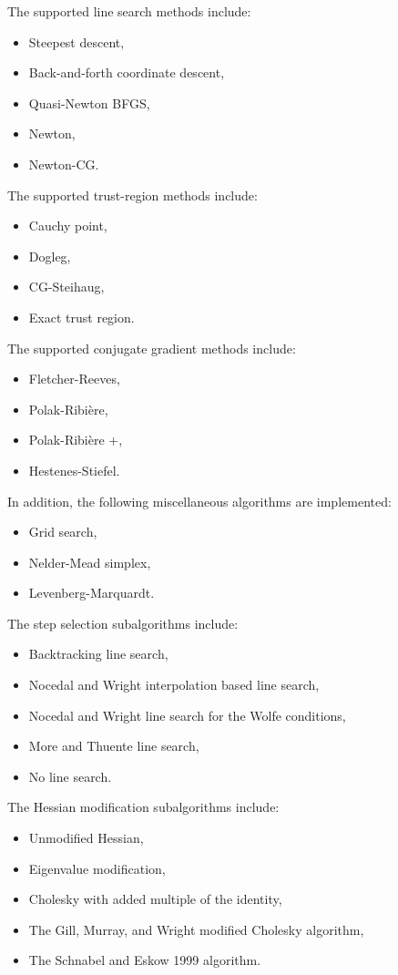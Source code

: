 The supported line search methods include:
\begin{itemize}
\item Steepest descent,
\item Back-and-forth coordinate descent,
\item Quasi-Newton BFGS,
\item Newton,
\item Newton-CG.
\end{itemize}

The supported trust-region methods include:
\begin{itemize}
\item Cauchy point,
\item Dogleg,
\item CG-Steihaug,
\item Exact trust region.
\end{itemize}

The supported conjugate gradient methods include:
\begin{itemize}
\item Fletcher-Reeves,
\item Polak-Ribi\`ere,
\item Polak-Ribi\`ere +,
\item Hestenes-Stiefel.
\end{itemize}

In addition, the following miscellaneous algorithms are implemented:
\begin{itemize}
\item Grid search,
\item Nelder-Mead simplex,
\item Levenberg-Marquardt.
\end{itemize}

The step selection subalgorithms include:
\begin{itemize}
\item Backtracking line search,
\item Nocedal and Wright interpolation based line search,
\item Nocedal and Wright line search for the Wolfe conditions,
\item More and Thuente line search,
\item No line search.
\end{itemize}

The Hessian modification subalgorithms include: 
\begin{itemize}
\item Unmodified Hessian,
\item Eigenvalue modification,
\item Cholesky with added multiple of the identity,
\item The Gill, Murray, and Wright modified Cholesky algorithm,
\item The Schnabel and Eskow 1999 algorithm.
\end{itemize}

